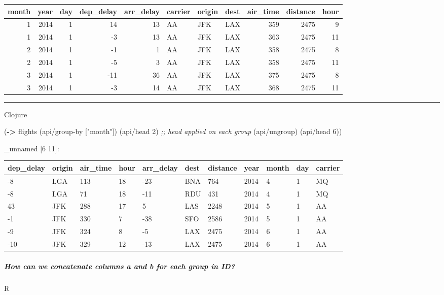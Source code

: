 \documentclass[]{article}
\newenvironment{Shaded}{\begin{snugshade}}{\end{snugshade}}
\newcommand{\KeywordTok}[1]{\textcolor[rgb]{0.13,0.29,0.53}{\textbf{#1}}}
\newcommand{\DecValTok}[1]{\textcolor[rgb]{0.00,0.00,0.81}{#1}}
\newcommand{\StringTok}[1]{\textcolor[rgb]{0.31,0.60,0.02}{#1}}
\newcommand{\CommentTok}[1]{\textcolor[rgb]{0.56,0.35,0.01}{\textit{#1}}}
\newcommand{\NormalTok}[1]{#1}
\let\oldsubparagraph\subparagraph
\renewcommand{\subparagraph}[1]{\oldsubparagraph{#1}\mbox{}}
\begin{document}
\begin{longtable}[]{@{}rrrrrlllrrr@{}}
\toprule
month & year & day & dep\_delay & arr\_delay & carrier & origin & dest &
air\_time & distance & hour\tabularnewline
\midrule
\endhead
1 & 2014 & 1 & 14 & 13 & AA & JFK & LAX & 359 & 2475 & 9\tabularnewline
1 & 2014 & 1 & -3 & 13 & AA & JFK & LAX & 363 & 2475 & 11\tabularnewline
2 & 2014 & 1 & -1 & 1 & AA & JFK & LAX & 358 & 2475 & 8\tabularnewline
2 & 2014 & 1 & -5 & 3 & AA & JFK & LAX & 358 & 2475 & 11\tabularnewline
3 & 2014 & 1 & -11 & 36 & AA & JFK & LAX & 375 & 2475 & 8\tabularnewline
3 & 2014 & 1 & -3 & 14 & AA & JFK & LAX & 368 & 2475 & 11\tabularnewline
\bottomrule
\end{longtable}

\begin{center}\rule{0.5\linewidth}{0.5pt}\end{center}

Clojure

\begin{Shaded}
\begin{Highlighting}[]
\NormalTok{(}\KeywordTok{->}\NormalTok{ flights}
\NormalTok{    (api/group-by [}\StringTok{"month"}\NormalTok{])}
\NormalTok{    (api/head }\DecValTok{2}\NormalTok{) }\CommentTok{;; head applied on each group}
\NormalTok{    (api/ungroup)}
\NormalTok{    (api/head }\DecValTok{6}\NormalTok{))}
\end{Highlighting}
\end{Shaded}

\_unnamed {[}6 11{]}:

\begin{longtable}[]{@{}lllllllllll@{}}
\toprule
dep\_delay & origin & air\_time & hour & arr\_delay & dest & distance &
year & month & day & carrier\tabularnewline
\midrule
\endhead
-8 & LGA & 113 & 18 & -23 & BNA & 764 & 2014 & 4 & 1 & MQ\tabularnewline
-8 & LGA & 71 & 18 & -11 & RDU & 431 & 2014 & 4 & 1 & MQ\tabularnewline
43 & JFK & 288 & 17 & 5 & LAS & 2248 & 2014 & 5 & 1 & AA\tabularnewline
-1 & JFK & 330 & 7 & -38 & SFO & 2586 & 2014 & 5 & 1 & AA\tabularnewline
-9 & JFK & 324 & 8 & -5 & LAX & 2475 & 2014 & 6 & 1 & AA\tabularnewline
-10 & JFK & 329 & 12 & -13 & LAX & 2475 & 2014 & 6 & 1 &
AA\tabularnewline
\bottomrule
\end{longtable}

\subparagraph{How can we concatenate columns a and b for each group in
ID?}\label{how-can-we-concatenate-columns-a-and-b-for-each-group-in-id}

R
\end{document}
